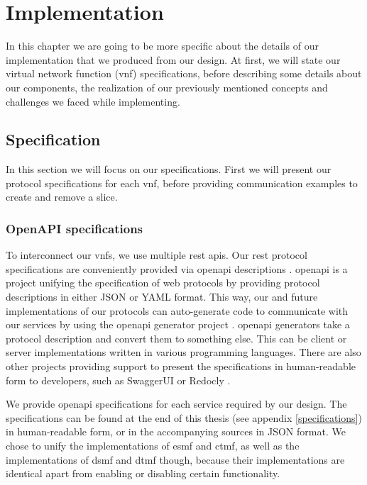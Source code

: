 \chapter{Implementation}
\label{implementation}

In this chapter we are going to be more specific about the details of our implementation that we produced from our design. At first, we will state our virtual network function (\acrshort{vnf}) specifications, before describing some details about our components, the realization of our previously mentioned concepts and challenges we faced while implementing.


\section{Specification}
\label{impl_specification}
In this section we will focus on our specifications. First we will present our protocol specifications for each \acrshort{vnf}, before providing communication examples to create and remove a slice.

\subsection{OpenAPI specifications}
To interconnect our \acrshort{vnf}s, we use multiple \acrshort{rest} \acrshort{api}s. Our \acrshort{rest} protocol specifications are conveniently provided via \Gls{openapi} descriptions \cite{openapi}. \Gls{openapi} is a project unifying the specification of web protocols by providing protocol descriptions in either JSON or YAML format. This way, our and future implementations of our protocols can auto-generate code to communicate with our services by using the \Gls{openapi} generator project \cite{openapi-generator}. \Gls{openapi} generators take a protocol description and convert them to something else. This can be client or server implementations written in various programming languages. There are also other projects providing support to present the specifications in human-readable form to developers, such as SwaggerUI \cite{swaggerui} or Redocly \cite{redocly}.

We provide \Gls{openapi} specifications for each service required by our design. The specifications can be found at the end of this thesis (see appendix \ref{specifications}) in human-readable form, or in the accompanying sources in JSON format. We chose to unify the implementations of \acrshort{esmf} and \acrshort{ctmf}, as well as the implementations of \acrshort{dsmf} and \acrshort{dtmf} though, because their implementations are identical apart from enabling or disabling certain functionality.

